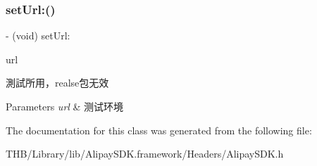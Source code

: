 \subsubsection{\texorpdfstring{set\+Url\+:()}{setUrl:()}}
{\footnotesize\ttfamily -\/ (void) set\+Url\+: \begin{DoxyParamCaption}\item[{(N\+S\+String $\ast$)}]{url }\end{DoxyParamCaption}}

測試所用，realse包无效


\begin{DoxyParams}{Parameters}
{\em url} & 测试环境 \\
\hline
\end{DoxyParams}


The documentation for this class was generated from the following file\+:\begin{DoxyCompactItemize}
\item 
T\+H\+B/\+Library/lib/\+Alipay\+S\+D\+K.\+framework/\+Headers/Alipay\+S\+D\+K.\+h\end{DoxyCompactItemize}
